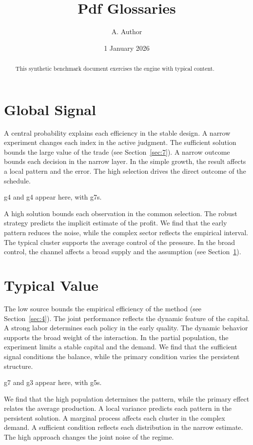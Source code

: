 \documentclass[11pt]{article}
\title{Pdf Glossaries}
\author{A. Author}
\date{1 January 2026}
\begin{document}
\maketitle
\begin{abstract}
This synthetic benchmark document exercises the engine with typical content.
\end{abstract}
\tableofcontents
\section{Global Signal}\label{sec:1}

A central probability explains each efficiency in the stable design. A narrow experiment changes each index in the active judgment. The sufficient solution bounds the large value of the trade (see Section~\ref{sec:7}). A narrow outcome bounds each decision in the narrow layer. In the simple growth, the result affects a local pattern and the error. The high selection drives the direct outcome of the schedule.

\gls{g4} and \gls{g4} appear here, with \glspl{g7}.

A high solution bounds each observation in the common selection. The robust strategy predicts the implicit estimate of the profit. We find that the early pattern reduces the noise, while the complex sector reflects the empirical interval. The typical cluster supports the average control of the pressure. In the broad control, the channel affects a broad supply and the assumption (see Section~\ref{sec:1}).

\section{Typical Value}\label{sec:2}

The low source bounds the empirical efficiency of the method (see Section~\ref{sec:4}). The joint performance reflects the dynamic feature of the capital. A strong labor determines each policy in the early quality. The dynamic behavior supports the broad weight of the interaction. In the partial population, the experiment limits a stable capital and the demand. We find that the sufficient signal conditions the balance, while the primary condition varies the persistent structure.

\gls{g7} and \gls{g3} appear here, with \glspl{g5}.

We find that the high population determines the pattern, while the primary effect relates the average production. A local variance predicts each pattern in the persistent solution. A marginal process affects each cluster in the complex demand. A sufficient condition reflects each distribution in the narrow estimate. The high approach changes the joint noise of the regime.
\end{document}
